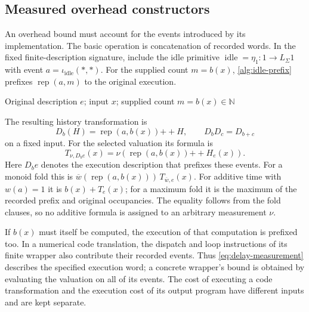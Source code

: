 \documentclass[11pt,a4paper]{article}
\numberwithin{algorithm}{section}
\numberwithin{equation}{section}
\theoremstyle{definition}
\theoremstyle{remark}
\theoremstyle{plain}
\newcommand{\N}{\mathbb N}
\newcommand{\LL}{L_{\Sigma}}
\theoremstyle{definition}
\theoremstyle{plain}
\begin{document}
\subsection{Measured overhead constructors}
An overhead bound must account for the events introduced by its
implementation. The basic operation is concatenation of recorded
words. In the fixed finite-description signature, include the
idle primitive $\operatorname{idle}=\eta_1:1\to\LL1$ with event
$a=\iota_{\mathrm{idle}}(*,*)$.
For the supplied count $m=b(x)$, \cref{alg:idle-prefix} prefixes
$\operatorname{rep}(a,m)$ to the original execution.
\begin{algorithm}[H]
\caption{Prefixing a supplied idle count}\label{alg:idle-prefix}
\small
\begin{algorithmic}[1]
\Require Original description $e$; input $x$; supplied count $m=b(x)\in\N$
  \State {}
\EndFor
\State \Return {}
\end{algorithmic}
\end{algorithm}
The resulting history transformation is
\[
 D_b(H)=\operatorname{rep}(a,b(x)){+\!+}H,
 \qquad D_bD_c=D_{b+c}
\]
on a fixed input. For the selected valuation its formula is
\begin{equation}\label{eq:delay-measurement}
 T_{\nu,D_b e}(x)=\nu(\operatorname{rep}(a,b(x)){+\!+}H_e(x)).
\end{equation}
Here $D_b e$ denotes the execution description that prefixes
these events. For a monoid fold this is
$\overline w(\operatorname{rep}(a,b(x)))\,T_{\overline w,e}(x)$.
For additive time with $w(a)=1$ it is $b(x)+T_e(x)$; for a maximum fold
it is the maximum of the recorded prefix and original occupancies.
The equality follows from the fold clauses, so no additive formula is
assigned to an arbitrary measurement $\nu$.

If $b(x)$ must itself be computed, the execution of that computation is
prefixed too. In a numerical code translation, the dispatch and
loop instructions of its finite wrapper also contribute their recorded
events. Thus \eqref{eq:delay-measurement} describes the specified execution
word; a concrete wrapper's bound is obtained by evaluating the valuation
on all of its events. The cost of executing a code transformation and
the execution cost of its output program have different inputs and are
kept separate.
\end{document}
